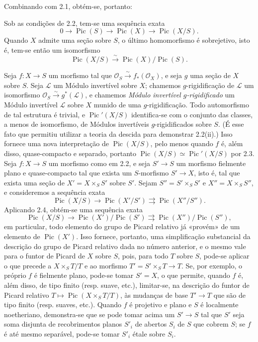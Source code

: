 Combinando com 2.1, obtém-se, portanto:

 Sob as condições de 2.2, tem-se uma sequência exata
\[
0\longrightarrow\operatorname{Pic}(S)\longrightarrow\operatorname{Pic}(X)
\longrightarrow\operatorname{Pic}(X/S).
\]
Quando $X$ admite uma seção sobre $S$, o último homomorfismo é sobrejetivo,
isto é, tem-se então um isomorfismo
\[
\operatorname{Pic}(X/S)\xrightarrow{\sim}
\operatorname{Pic}(X)/\operatorname{Pic}(S).
\]

 Seja $f:X\longrightarrow S$ um morfismo tal que
$\mathcal O_S\xrightarrow{\sim}f_*(\mathcal O_X)$, e seja $g$ uma seção de
$X$ sobre $S$. Seja $\mathcal L$ um Módulo invertível sobre $X$; chamemos
$g$-rigidificação de $\mathcal L$ um isomorfismo
$\mathcal O_S\xrightarrow{\sim}g^*(\mathcal L)$, e chamemos \emph{Módulo
invertível $g$-rigidificado} um Módulo invertível $\mathcal L$ sobre $X$ munido
de uma $g$-rigidificação. Todo automorfismo de tal estrutura é trivial, e
$\operatorname{Pic}'(X/S)$ identifica-se com o conjunto das classes, a menos de
isomorfismo, de Módulos invertíveis $g$-rigidificados sobre $S$. (É esse fato que permitiu
utilizar a teoria da descida para demonstrar 2.2(ii).) Isso fornece uma nova
interpretação de $\operatorname{Pic}(X/S)$, pelo menos quando $f$ é, além disso,
quase-compacto e separado, portanto
$\operatorname{Pic}(X/S)\simeq\operatorname{Pic}'(X/S)$ por 2.3.
 Seja $f:X\longrightarrow S$ um morfismo como em
2.2, e seja $S'\longrightarrow S$ um morfismo fielmente plano e
quase-compacto tal que exista um $S$-morfismo $S'\longrightarrow X$, isto é,
tal que exista uma seção de $X'=X\times_SS'$ sobre $S'$. Sejam
$S''=S'\times_SS'$ e $X''=X\times_SS''$, e consideremos a sequência exata
\[
\operatorname{Pic}(X/S)\longrightarrow\operatorname{Pic}(X'/S')
\rightrightarrows\operatorname{Pic}(X''/S'').
\]
Aplicando 2.4, obtém-se uma sequência exata
\[
\operatorname{Pic}(X/S)\longrightarrow
\operatorname{Pic}(X')/\operatorname{Pic}(S')
\rightrightarrows
\operatorname{Pic}(X'')/\operatorname{Pic}(S''),
\]
em particular, todo elemento do grupo de Picard relativo já «provém» de um
elemento de $\operatorname{Pic}(X')$. Isso fornece, portanto, uma simplificação
substancial da descrição do grupo de Picard relativo dada no número anterior,
e o mesmo vale para o funtor de Picard de $X$ sobre $S$, pois, para todo $T$
sobre $S$, pode-se aplicar o que precede a $X\times_ST/T$ e ao morfismo
$T'=S'\times_ST\longrightarrow T$. Se, por exemplo, o próprio $f$ é fielmente
plano, pode-se tomar $S'=X$, o que permite, quando $f$ é, além disso, de tipo
finito (resp. suave, etc.), limitar-se, na descrição do funtor de Picard relativo
$T\longmapsto\operatorname{Pic}(X\times_ST/T)$, às mudanças de base
$T'\longrightarrow T$ que são de tipo finito (resp. suaves, etc.). Quando $f$
é projetivo e plano e $S$ é localmente noetheriano, demonstra-se que se pode
tomar acima um $S'\longrightarrow S$ tal que $S'$ seja soma disjunta de
recobrimentos planos $S'_i$ de abertos $S_i$ de $S$ que cobrem $S$; se $f$ é
até mesmo separável, pode-se tomar $S'_i$ étale sobre $S_i$.

